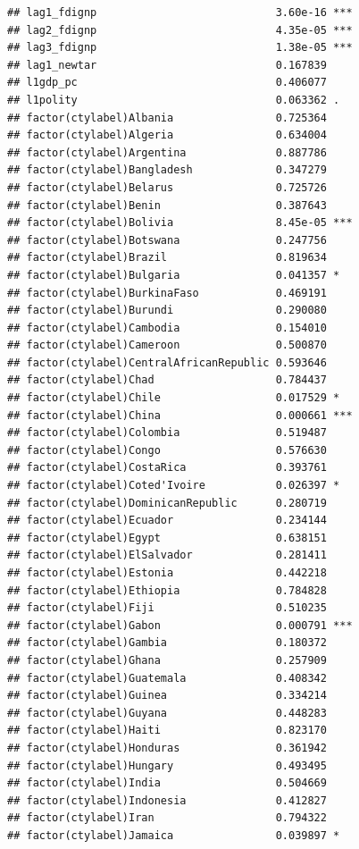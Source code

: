 \documentclass[12pt]{article}\usepackage[]{graphicx}\usepackage[]{color}
\makeatletter
\newenvironment{kframe}{%
 \def\at@end@of@kframe{}%
 \ifinner\ifhmode%
  \def\at@end@of@kframe{\end{minipage}}%
  \begin{minipage}{\columnwidth}%
 \fi\fi%
 \def\FrameCommand##1{\hskip\@totalleftmargin \hskip-\fboxsep
 \colorbox{shadecolor}{##1}\hskip-\fboxsep
     \hskip-\linewidth \hskip-\@totalleftmargin \hskip\columnwidth}%
 \MakeFramed {\advance\hsize-\width
   \@totalleftmargin\z@ \linewidth\hsize
   \@setminipage}}%
 {\par\unskip\endMakeFramed%
 \at@end@of@kframe}
\newenvironment{knitrout}{}{} %
\makeatother
\begin{document}
\begin{knitrout}
\begin{kframe}
\begin{verbatim}
## lag1_fdignp                            3.60e-16 ***
## lag2_fdignp                            4.35e-05 ***
## lag3_fdignp                            1.38e-05 ***
## lag1_newtar                            0.167839    
## l1gdp_pc                               0.406077    
## l1polity                               0.063362 .  
## factor(ctylabel)Albania                0.725364    
## factor(ctylabel)Algeria                0.634004    
## factor(ctylabel)Argentina              0.887786    
## factor(ctylabel)Bangladesh             0.347279    
## factor(ctylabel)Belarus                0.725726    
## factor(ctylabel)Benin                  0.387643    
## factor(ctylabel)Bolivia                8.45e-05 ***
## factor(ctylabel)Botswana               0.247756    
## factor(ctylabel)Brazil                 0.819634    
## factor(ctylabel)Bulgaria               0.041357 *  
## factor(ctylabel)BurkinaFaso            0.469191    
## factor(ctylabel)Burundi                0.290080    
## factor(ctylabel)Cambodia               0.154010    
## factor(ctylabel)Cameroon               0.500870    
## factor(ctylabel)CentralAfricanRepublic 0.593646    
## factor(ctylabel)Chad                   0.784437    
## factor(ctylabel)Chile                  0.017529 *  
## factor(ctylabel)China                  0.000661 ***
## factor(ctylabel)Colombia               0.519487    
## factor(ctylabel)Congo                  0.576630    
## factor(ctylabel)CostaRica              0.393761    
## factor(ctylabel)Coted'Ivoire           0.026397 *  
## factor(ctylabel)DominicanRepublic      0.280719    
## factor(ctylabel)Ecuador                0.234144    
## factor(ctylabel)Egypt                  0.638151    
## factor(ctylabel)ElSalvador             0.281411    
## factor(ctylabel)Estonia                0.442218    
## factor(ctylabel)Ethiopia               0.784828    
## factor(ctylabel)Fiji                   0.510235    
## factor(ctylabel)Gabon                  0.000791 ***
## factor(ctylabel)Gambia                 0.180372    
## factor(ctylabel)Ghana                  0.257909    
## factor(ctylabel)Guatemala              0.408342    
## factor(ctylabel)Guinea                 0.334214    
## factor(ctylabel)Guyana                 0.448283    
## factor(ctylabel)Haiti                  0.823170    
## factor(ctylabel)Honduras               0.361942    
## factor(ctylabel)Hungary                0.493495    
## factor(ctylabel)India                  0.504669    
## factor(ctylabel)Indonesia              0.412827    
## factor(ctylabel)Iran                   0.794322    
## factor(ctylabel)Jamaica                0.039897 *  

\end{verbatim}
\end{kframe}
\end{knitrout}
\end{document}
